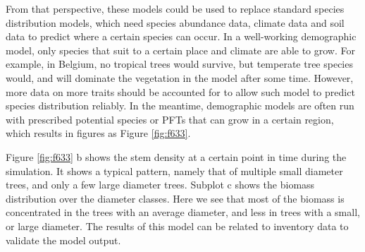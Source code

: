 \documentclass[12pt,oneside]{book}
\begin{document}
From that perspective, these models could be used to replace standard
species distribution models, which need species abundance data, climate
data and soil data to predict where a certain species can occur. In a
well-working demographic model, only species that suit to a certain
place and climate are able to grow. For example, in Belgium, no tropical
trees would survive, but temperate tree species would, and will dominate
the vegetation in the model after some time. However, more data on more
traits should be accounted for to allow such model to predict species
distribution reliably. In the meantime, demographic models are often run
with prescribed potential species or PFTs that can grow in a certain
region, which results in figures as Figure \ref{fig:f633}.

Figure \ref{fig:f633} b shows the stem density at a certain point in
time during the simulation. It shows a typical pattern, namely that of
multiple small diameter trees, and only a few large diameter trees.
Subplot c shows the biomass distribution over the diameter classes. Here
we see that most of the biomass is concentrated in the trees with an
average diameter, and less in trees with a small, or large diameter. The
results of this model can be related to inventory data to validate the
model output.
\end{document}
